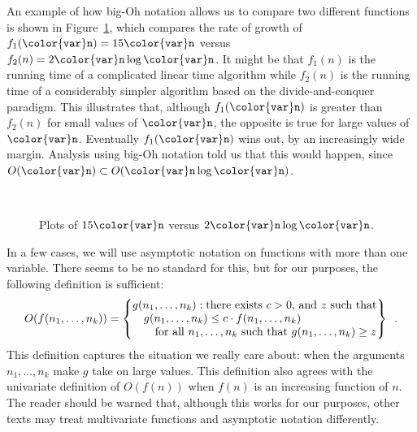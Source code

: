 \documentclass[10pt]{book}
\newcommand{\figlabel}[1]{\label{fig:#1}}
\newcommand{\figref}[1]{Figure~\ref{fig:#1}}
\theoremstyle{plain}
\theoremstyle{definition}
\begin{document}
An example of how big-Oh notation allows us to compare two different
functions is shown in \figref{intro-asymptotics}, which compares the rate
of growth of $f_1(\ensuremath{\mathtt{{\color{var}n}}})=15\ensuremath{\mathtt{{\color{var}n}}}$ versus $f_2(n)=2\ensuremath{\mathtt{{\color{var}n}}}\log\ensuremath{\mathtt{{\color{var}n}}}$.  It might be
that $f_1(n)$  is the running time of a complicated linear time algorithm
while $f_2(n)$ is the running time of a considerably simpler algorithm
based on the divide-and-conquer paradigm.  This illustrates that,
although $f_1(\ensuremath{\mathtt{{\color{var}n}}})$ is greater than $f_2(n)$ for small values of \ensuremath{\mathtt{{\color{var}n}}},
the opposite is true for large values of \ensuremath{\mathtt{{\color{var}n}}}.  Eventually $f_1(\ensuremath{\mathtt{{\color{var}n}}})$
wins out, by an increasingly wide margin.  Analysis using big-Oh notation
told us that this would happen, since $O(\ensuremath{\mathtt{{\color{var}n}}})\subset O(\ensuremath{\mathtt{{\color{var}n}}}\log \ensuremath{\mathtt{{\color{var}n}}})$.

\begin{figure}
  \begin{center}
    \newlength{\tmpa}\setlength{\tmpa}{.98\linewidth}
    \addtolength{\tmpa}{-4mm}
    \resizebox{\tmpa}{!}{}\\[4ex]
    \resizebox{.98\linewidth}{!}{}
  \end{center}
  \caption{Plots of $15\ensuremath{\mathtt{{\color{var}n}}}$ versus $2\ensuremath{\mathtt{{\color{var}n}}}\log\ensuremath{\mathtt{{\color{var}n}}}$.}
  \figlabel{intro-asymptotics}
\end{figure}

In a few cases, we will use asymptotic notation on functions with more
than one variable. There seems to be no standard for this, but for our
purposes, the following definition is sufficient:
\[
   O(f(n_1,\ldots,n_k)) = 
   \left\{\begin{array}{@{}l@{}}
             g(n_1,\ldots,n_k):\mbox{there exists $c>0$, and $z$ such that} \\
             \quad \mbox{$g(n_1,\ldots,n_k) \le c\cdot f(n_1,\ldots,n_k)$} \\
             \qquad \mbox{for all $n_1,\ldots,n_k$ such that $g(n_1,\ldots,n_k)\ge z$}   
   \end{array}\right\} \enspace .
\]
This definition captures the situation we really care about:  when the
arguments $n_1,\ldots,n_k$ make $g$ take on large values.  This definition
also agrees with the univariate definition of $O(f(n))$ when $f(n)$
is an increasing function of $n$.  The reader should be warned that,
although this works for our purposes, other texts may treat multivariate
functions and asymptotic notation differently.
\end{document}
